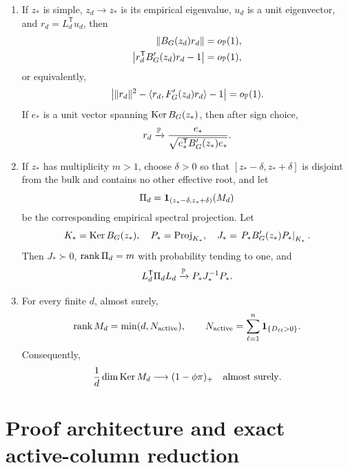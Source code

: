 \begin{theorem}
\begin{enumerate}
\item If $z_*$ is simple, $z_d\to z_*$ is its empirical eigenvalue, $u_d$ is a unit eigenvector, and $r_d=L_d^{\mathsf T}u_d$, then
\begin{align}
\|B_G(z_d)r_d\|&=o_{\mathbb{P}}(1),\label{S:evec1}\\
\left|r_d^{\mathsf T}B_G'(z_d)r_d-1\right|&=o_{\mathbb{P}}(1),
\label{S:evec2}
\end{align}
or equivalently,
\begin{equation}
\left|\|r_d\|^2-
\langle r_d,F_G'(z_d)r_d\rangle-1\right|=o_{\mathbb{P}}(1).
\label{S:evec2-equivalent}
\end{equation}
If $e_*$ is a unit vector spanning $\operatorname{Ker} B_G(z_*)$, then after sign choice,
\begin{equation}
r_d\xrightarrow{\mathbb{P}}
\frac{e_*}{\sqrt{e_*^{\mathsf T}B_G'(z_*)e_*}}.
\label{S:eveclimit}
\end{equation}

\item If $z_*$ has multiplicity $m>1$, choose $\delta>0$ so that
$[z_*-\delta,z_*+\delta]$ is disjoint from the bulk and contains no other
effective root, and let
\begin{equation}
\Pi_d=\mathbf{1}_{(z_*-\delta,z_*+\delta)}(M_d)
\end{equation}
be the corresponding empirical spectral projection. Let
\begin{equation}
K_*=\operatorname{Ker} B_G(z_*),\quad P_*=\operatorname{Proj}_{K_*},\quad
J_*=\left.P_*B_G'(z_*)P_*\right|_{K_*}.
\end{equation}
Then $J_*\succ0$, $\operatorname{rank}\Pi_d=m$ with probability tending to one, and
\begin{equation}
L_d^{\mathsf T}\Pi_dL_d
\xrightarrow{\mathbb{P}}P_*J_*^{-1}P_*.
\label{S:projection}
\end{equation}

\item For every finite $d$, almost surely,
\begin{equation}
\operatorname{rank} M_d=\min(d,N_{\mathrm{active}}),\qquad
N_{\mathrm{active}}=\sum_{\ell=1}^n\mathbf{1}_{\{D_{\ell\ell}>0\}}.
\label{S:rank}
\end{equation}
Consequently,
\begin{equation}
\frac1d\dim\operatorname{Ker} M_d\longrightarrow(1-\phi\pi)_+
\quad\text{almost surely}.
\label{S:nullity}
\end{equation}
\end{enumerate}
\end{theorem}


\section{Proof architecture and exact active-column reduction}
\label{S:active-section}

